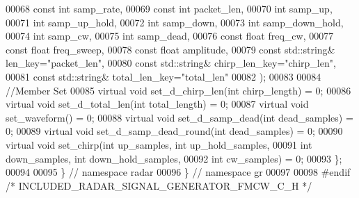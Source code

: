 \begin{DoxyCode}
00068         \textcolor{keyword}{const} \textcolor{keywordtype}{int} samp_rate,
00069         \textcolor{keyword}{const} \textcolor{keywordtype}{int} packet\_len,
00070         \textcolor{keywordtype}{int} samp_up,
00071         \textcolor{keywordtype}{int} samp\_up\_hold,
00072         \textcolor{keywordtype}{int} samp_down,
00073         \textcolor{keywordtype}{int} samp\_down\_hold,
00074         \textcolor{keywordtype}{int} samp_cw,
00075         \textcolor{keywordtype}{int} samp\_dead,
00076         \textcolor{keyword}{const} \textcolor{keywordtype}{float} freq_cw,
00077         \textcolor{keyword}{const} \textcolor{keywordtype}{float} freq\_sweep,
00078         \textcolor{keyword}{const} \textcolor{keywordtype}{float} amplitude,
00079         \textcolor{keyword}{const} std::string& len\_key=\textcolor{stringliteral}{"packet\_len"},
00080         \textcolor{keyword}{const} std::string& chirp\_len\_key=\textcolor{stringliteral}{"chirp\_len"},
00081         \textcolor{keyword}{const} std::string& total\_len\_key=\textcolor{stringliteral}{"total\_len"}
00082       );
00083 
00084       \textcolor{comment}{//Member Set}
00085       \textcolor{keyword}{virtual} \textcolor{keywordtype}{void} set\_d\_chirp\_len(\textcolor{keywordtype}{int} chirp\_length) = 0;
00086       \textcolor{keyword}{virtual} \textcolor{keywordtype}{void} set\_d\_total\_len(\textcolor{keywordtype}{int} total\_length) = 0;
00087       \textcolor{keyword}{virtual} \textcolor{keywordtype}{void} set\_waveform() = 0;
00088       \textcolor{keyword}{virtual} \textcolor{keywordtype}{void} set\_d\_samp\_dead(\textcolor{keywordtype}{int} dead\_samples) = 0;
00089       \textcolor{keyword}{virtual} \textcolor{keywordtype}{void} set\_d\_samp\_dead\_round(\textcolor{keywordtype}{int} dead\_samples) = 0;
00090       \textcolor{keyword}{virtual} \textcolor{keywordtype}{void} set\_chirp(\textcolor{keywordtype}{int} up\_samples, \textcolor{keywordtype}{int} up\_hold\_samples,
00091                      \textcolor{keywordtype}{int} down\_samples, \textcolor{keywordtype}{int} down\_hold\_samples,
00092                      \textcolor{keywordtype}{int} cw\_samples) = 0;
00093     \};
00094 
00095   \} \textcolor{comment}{// namespace radar}
00096 \} \textcolor{comment}{// namespace gr}
00097 
00098 \textcolor{preprocessor}{#endif }\textcolor{comment}{/* INCLUDED\_RADAR\_SIGNAL\_GENERATOR\_FMCW\_C\_H */}\textcolor{preprocessor}{}
\end{DoxyCode}
